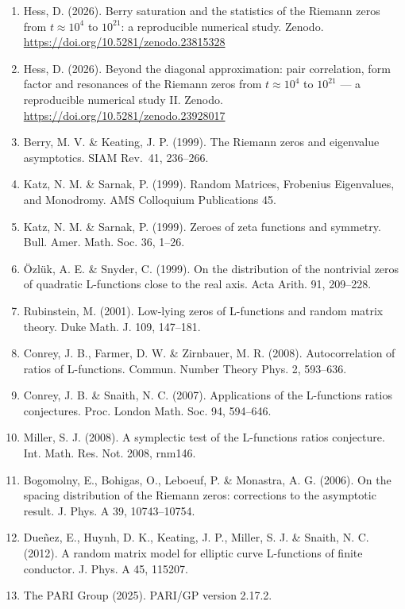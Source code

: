 \documentclass[
  10pt,
]{article}
\providecommand{\tightlist}{%
  \setlength{\itemsep}{0pt}\setlength{\parskip}{0pt}}
\begin{document}
\begin{enumerate}
\def\labelenumi{\arabic{enumi}.}
\tightlist
\item
  Hess, D. (2026). Berry saturation and the statistics of the Riemann
  zeros from \(t \approx 10^4\) to \(10^{21}\): a reproducible numerical
  study. Zenodo. \url{https://doi.org/10.5281/zenodo.23815328}
\item
  Hess, D. (2026). Beyond the diagonal approximation: pair correlation,
  form factor and resonances of the Riemann zeros from
  \(t \approx 10^4\) to \(10^{21}\) --- a reproducible numerical study
  II. Zenodo. \url{https://doi.org/10.5281/zenodo.23928017}
\item
  Berry, M. V. \& Keating, J. P. (1999). The Riemann zeros and
  eigenvalue asymptotics. SIAM Rev.~41, 236--266.
\item
  Katz, N. M. \& Sarnak, P. (1999). Random Matrices, Frobenius
  Eigenvalues, and Monodromy. AMS Colloquium Publications 45.
\item
  Katz, N. M. \& Sarnak, P. (1999). Zeroes of zeta functions and
  symmetry. Bull. Amer. Math. Soc. 36, 1--26.
\item
  Özlük, A. E. \& Snyder, C. (1999). On the distribution of the
  nontrivial zeros of quadratic L-functions close to the real axis. Acta
  Arith. 91, 209--228.
\item
  Rubinstein, M. (2001). Low-lying zeros of L-functions and random
  matrix theory. Duke Math. J. 109, 147--181.
\item
  Conrey, J. B., Farmer, D. W. \& Zirnbauer, M. R. (2008).
  Autocorrelation of ratios of L-functions. Commun. Number Theory Phys.
  2, 593--636.
\item
  Conrey, J. B. \& Snaith, N. C. (2007). Applications of the L-functions
  ratios conjectures. Proc. London Math. Soc. 94, 594--646.
\item
  Miller, S. J. (2008). A symplectic test of the L-functions ratios
  conjecture. Int. Math. Res. Not. 2008, rnm146.
\item
  Bogomolny, E., Bohigas, O., Leboeuf, P. \& Monastra, A. G. (2006). On
  the spacing distribution of the Riemann zeros: corrections to the
  asymptotic result. J. Phys. A 39, 10743--10754.
\item
  Dueñez, E., Huynh, D. K., Keating, J. P., Miller, S. J. \& Snaith, N.
  C. (2012). A random matrix model for elliptic curve L-functions of
  finite conductor. J. Phys. A 45, 115207.
\item
  The PARI Group (2025). PARI/GP version 2.17.2.

\end{enumerate}
\end{document}
